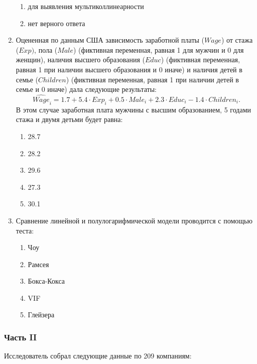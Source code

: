 \begin{enumerate}
\begin{enumerate}
	\item для выявления мультиколлинеарности
	\item нет верного ответа
	\end{enumerate}
\item Оцененная по данным США зависимость заработной платы ($Wage$) от стажа ($Exp)$, пола ($Male$) (фиктивная переменная, равная 1 для мужчин и 0 для женщин), наличия высшего образования ($Educ$) (фиктивная переменная, равная 1 при наличии высшего образования и 0 иначе) и наличия детей в семье ($Children$) (фиктивная переменная, равная 1 при наличии детей в семье и 0 иначе) дала следующие результаты:
 \[
 \hat{Wage}_i = 1.7 + 5.4 \cdot Exp_i + 0.5 \cdot Male_i + 2.3 \cdot Educ_i - 1.4 \cdot Children_i.
 \]
В этом случае заработная плата мужчины с высшим образованием, 5 годами стажа и двумя детьми будет равна:
	\begin{enumerate}
	\item 28.7
	\item 28.2
	\item 29.6
	\item 27.3
	\item 30.1
	\end{enumerate}
\item Сравнение линейной и полулогарифмической модели проводится с помощью теста:
	\begin{enumerate}
	\item Чоу
	\item Рамсея
	\item Бокса-Кокса
	\item VIF
	\item Глейзера
	\end{enumerate}

\end{enumerate}
\subsubsection*{Часть II}

Исследователь собрал следующие данные по 209 компаниям:

